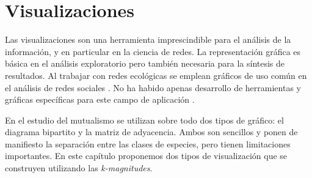 
\chapter{Visualizaciones} %
\label{chapterVISUALIZACIONES}

Las visualizaciones son una herramienta imprescindible para el análisis de la información, y en particular en la ciencia de redes. La representación gráfica es básica en el análisis exploratorio pero también necesaria para la síntesis de resultados. Al trabajar con redes ecológicas se emplean gráficos de uso común en el análisis de redes sociales \cite{freeman2012social}. No ha habido apenas desarrollo de herramientas y gráficas específicas para este campo de aplicación \cite{yoon20043d, kazanci2007econet, lane2014visualization}.

En el estudio del mutualismo se utilizan sobre todo dos tipos de gráfico: el diagrama bipartito y la matriz de adyacencia. Ambos son sencillos y ponen de manifiesto la separación entre las clases de especies, pero tienen limitaciones importantes. En este capítulo proponemos dos tipos de visualización que se construyen utilizando las \textit{k-magnitudes}.

